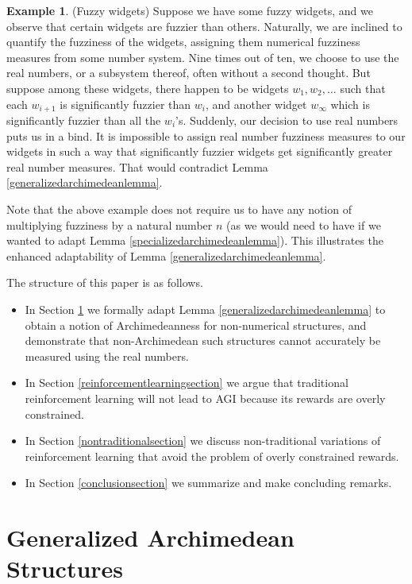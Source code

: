 \documentclass[reqno]{article}
\theoremstyle{definition}
\newtheorem{example}[theorem]{Example}
\begin{document}
\begin{example}
\label{fuzzywidgets}
(Fuzzy widgets)
Suppose we have some fuzzy widgets, and we observe that certain
widgets are fuzzier than others. Naturally, we are inclined to
quantify the fuzziness of the widgets, assigning them numerical
fuzziness measures from some number system. Nine times out of ten,
we choose to use the real numbers, or a subsystem thereof,
often without a second thought. But suppose
among these widgets, there happen to be widgets $w_1,w_2,\ldots$
such that each $w_{i+1}$ is significantly fuzzier than $w_i$,
and another widget $w_\infty$ which is significantly fuzzier than all the $w_i$'s.
Suddenly, our decision to use real numbers puts us in a bind.
It is impossible to assign real number fuzziness measures to our
widgets in such a way that significantly fuzzier widgets get
significantly greater real number measures. That would
contradict Lemma \ref{generalizedarchimedeanlemma}.
\end{example}

Note that the above example does not require us to have any notion
of multiplying fuzziness by a natural number $n$ (as we would need to have
if we wanted to adapt Lemma \ref{specializedarchimedeanlemma}).
This illustrates the enhanced adaptability of Lemma \ref{generalizedarchimedeanlemma}.

The structure of this paper is as follows.
\begin{itemize}
    \item
    In Section \ref{backgroundsection} we formally adapt
    Lemma \ref{generalizedarchimedeanlemma} to obtain a notion of Archimedeanness
    for non-numerical structures, and demonstrate that non-Archimedean such
    structures cannot accurately be measured using the real numbers.
    \item
    In Section \ref{reinforcementlearningsection} we argue that
    traditional reinforcement learning will not lead to AGI because
    its rewards are overly constrained.
    \item
    In Section \ref{nontraditionalsection} we discuss non-traditional
    variations of reinforcement learning that avoid the problem of
    overly constrained rewards.
    \item
    In Section \ref{conclusionsection} we summarize and make concluding remarks.
\end{itemize}


\section{Generalized Archimedean Structures}
\label{backgroundsection}
\end{document}
